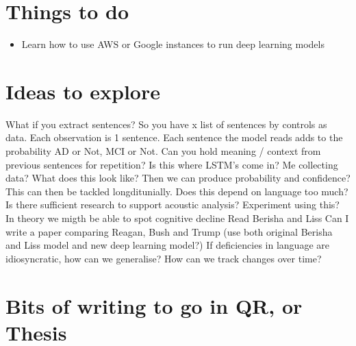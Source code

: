 \documentclass[a4paper]{book}
\begin{document}
\section {Things to do}
\begin {itemize}
    \item Learn how to use AWS or Google instances to run deep learning models
\end {itemize}
\section {Ideas to explore}
What if you extract sentences? So you have x list of sentences by controls as data. Each observation is 1 sentence. Each sentence the model reads adds to the probability AD or Not, MCI or Not. \newline
Can you hold meaning / context from previous sentences for repetition? Is this where LSTM's come in? \newline
Me collecting data? What does this look like? Then we can produce probability and confidence? This can then be tackled longditunially. \newline
Does this depend on language too much? Is there sufficient research to support acoustic analysis?
Experiment using this? In theory we migth be able to spot cognitive decline \newline
Read Berisha and Liss \newline
Can I write a paper comparing Reagan, Bush and Trump (use both original Berisha and Liss model and new deep learning model?)
If deficiencies in language are idiosyncratic, how can we generalise? How can we track changes over time?


\section {Bits of writing to go in QR, or Thesis}
\end{document}
